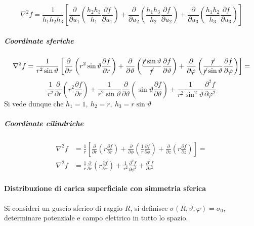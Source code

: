 $$
\nabla^2 f = \frac{1}{h_1h_2h_3} \left[ \frac{\partial}{\partial u_1}
\left(\frac{h_2h_3}{h_1}\frac{\partial f}{\partial u_1}\right) + 
\frac{\partial}{\partial u_2}
\left(\frac{h_1h_3}{h_2}\frac{\partial f}{\partial u_2}\right) + 
\frac{\partial}{\partial u_3}
\left(\frac{h_1h_2}{h_3}\frac{\partial f}{\partial u_3}\right)\right]
$$
\subparagraph{Coordinate sferiche}
$$
\nabla^2 f = \frac{1}{r^2\sin\vartheta} \left[\frac{\partial}{\partial r}\left(r^2\sin\vartheta\frac{\partial f}{\partial r}\right)+
\frac{\partial}{\partial \vartheta}\left( \frac{\cancel{r}\sin\vartheta}{\cancel{r}}\frac{\partial f}{\partial \vartheta}\right) +
\frac{\partial}{\partial \varphi}\left( \frac{\cancel{r}}{\cancel{r}\sin\vartheta}\frac{\partial f}{\partial \varphi}\right) \right] =
$$
$$
\frac{1}{r^2}\frac{\partial}{\partial r} \left(r^2 \frac{\partial f}{\partial r} \right) 
+ \frac{1}{r^2 \sin\vartheta}\frac{\partial}{\partial \vartheta} \left(\sin \vartheta \frac{\partial f}{\partial \vartheta}\right) +
\frac{1}{r^2\sin^2\vartheta} \frac{\partial^2 f}{\partial \varphi^2}
$$
Si vede dunque che $h_1=1,\ h_2=r,\ h_3 = r\sin\vartheta$
\subparagraph{Coordinate cilindriche}
$$
\begin{aligned}
\nabla^2 f &= \frac{1}{r} \left[\frac{\partial}{\partial r}\left(r\frac{\partial f}{\partial r} \right) + \frac{\partial}{\partial \phi}\left(\frac{1}{r}\frac{\partial f }{\partial \phi} \right) + \frac{\partial}{\partial z} \left(r \frac{\partial f}{\partial z}\right) \right] = \\
\nabla^2 f &= \frac{1}{r}\frac{\partial}{\partial r} \left(r\frac{\partial f }{\partial r}\right) + \frac{1}{r^2}\frac{\partial^2 f}{\partial \phi^2} + \frac{\partial^2 f}{\partial z^2}
\end{aligned}
$$

\paragraph{Distribuzione di carica superficiale con simmetria sferica}
Si consideri un guscio sferico di raggio $R$, si definisce 
$\sigma(R,\vartheta,\varphi) = \sigma_0$, determinare potenziale e campo elettrico in
tutto lo spazio.

